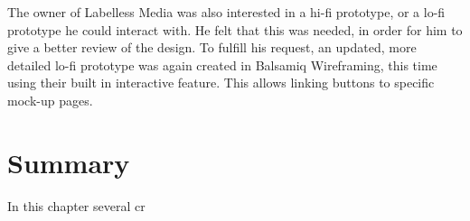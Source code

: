 The owner of Labelless Media was also interested in a hi-fi prototype, or a lo-fi prototype he could interact with. He felt that this was needed, in order for him to give a better review of the design. To fulfill his request, an updated, more detailed lo-fi prototype was again created in Balsamiq Wireframing, this time using their built in interactive feature. This allows linking buttons to specific mock-up pages. 

\section{Summary}
In this chapter several cr